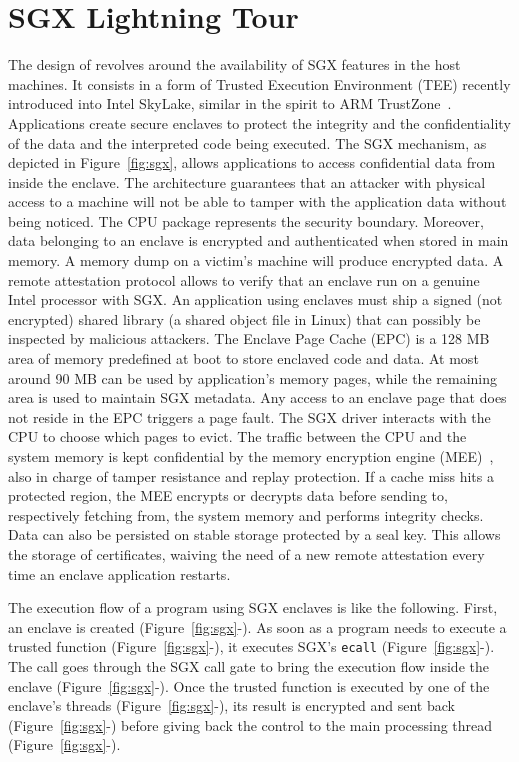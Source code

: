 \section{SGX Lightning Tour}
\label{sec:background}
The design of \SYS revolves around the availability of SGX features in the host machines. 
It consists in a form of Trusted Execution Environment (TEE) recently introduced into Intel SkyLake, similar in the spirit to ARM TrustZone~\cite{arm2009security}. 
Applications create secure enclaves to protect the integrity and the confidentiality of the data and the interpreted code being executed. 
The SGX mechanism, as depicted in Figure~\ref{fig:sgx}, allows applications to access confidential data from inside the enclave. 
The architecture guarantees that an attacker with physical access to a machine will not be able to tamper with the application data without being noticed. 
The CPU package represents the security boundary. 
Moreover, data belonging to an enclave is encrypted and authenticated when stored in main memory. 
A memory dump on a victim’s machine will produce encrypted data. 
A remote attestation protocol allows to verify that an enclave run on a genuine Intel processor with SGX. 
An application using enclaves must ship a signed (not encrypted) shared library (a shared object file in Linux) that can possibly be inspected by malicious attackers. 
The Enclave Page Cache (EPC) is a 128 MB area of memory predefined at boot to store enclaved code and data. 
At most around 90 MB can be used by application’s memory pages, while the remaining area is used to maintain SGX metadata. 
Any access to an enclave page that does not reside in the EPC triggers a page fault. 
The SGX driver interacts with the CPU to choose which pages to evict. 
The traffic between the CPU and the system memory is kept confidential by the memory encryption engine (MEE)~\cite{gueron2016memory}, also in charge of tamper resistance and replay protection. 
If a cache miss hits a protected region, the MEE encrypts or decrypts data before sending to, respectively fetching from, the system memory and performs integrity checks. 
Data can also be persisted on stable storage protected by a seal key. 
This allows the storage of certificates, waiving the need of a new remote attestation every time an enclave application restarts.

The execution flow of a program using SGX enclaves is like the following.
First, an enclave is created (Figure~\ref{fig:sgx}-).
As soon as a program needs to execute a trusted function (Figure~\ref{fig:sgx}-), it executes SGX's \texttt{ecall} (Figure~\ref{fig:sgx}-).
The call goes through the SGX call gate to bring the execution flow inside the enclave (Figure~\ref{fig:sgx}-).
Once the trusted function is executed by one of the enclave's threads (Figure~\ref{fig:sgx}-), its result is encrypted and sent back (Figure~\ref{fig:sgx}-) before giving back the control to the main processing thread (Figure~\ref{fig:sgx}-).
